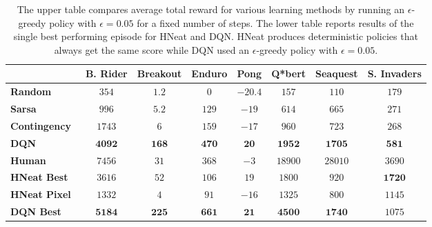 \documentclass{article} \usepackage{nips13submit_e,times}
\begin{document}
\begin{table}
\begin{center}
\begin{tabular}{ |l | c | c | c | c | c | c | c |}
	\hline
	& {\small \textbf{B. Rider}} & {\small \textbf{Breakout}} & {\small \textbf{Enduro}} & {\small \textbf{Pong}} & {\small \textbf{Q*bert}} & {\small \textbf{Seaquest}} & {\small \textbf{S. Invaders}}\\
	\hline
	{\small \textbf{Random}}                                    & $354$ & $1.2$ & $0$ & $-20.4$ & $157$ & $110$ & $179$ \\
	\hline
	{\small \textbf{Sarsa}~\cite{bellemare-ale}}                & $996$ & $5.2$ & $129$ & $-19$ & $614$ & $665$ & $271$ \\
	\hline
	{\small \textbf{Contingency}~\cite{bellemare-contingency} } & $1743$ & $6$ & $159$ & $-17$ & $960$ & $723$ & $268$ \\
	\hline
	{\small \textbf{DQN} }                                      & $\textbf{4092}$ & $\textbf{168}$ & $\textbf{470}$ & $\textbf{20}$ & $\textbf{1952}$ & $\textbf{1705}$ & $\textbf{581}$ \\
	\hline
	{\small \textbf{Human} }                                    & $7456$ & $31$ & $368$ & $-3$ & $18900$ & $28010$ & $3690$ \\
	\hline
	\hline
	{\small \textbf{HNeat Best} \cite{hausknecht-neuro}}        & $3616$ & $52$ & $106$ & $19$ & $1800$ & $920$ & $\textbf{1720}$ \\
	\hline
	{\small \textbf{HNeat Pixel} \cite{hausknecht-neuro}}       & $1332$ & $4$ & $91$ & $-16$ & $1325$ & $800$ & $1145$ \\
	\hline
	{\small \textbf{DQN Best}}                                  & $\textbf{5184}$ & $\textbf{225}$ & $\textbf{661}$ & $\textbf{21}$ & $\textbf{4500}$ & $\textbf{1740}$ & $1075$ \\
	\hline
\end{tabular}
\caption{\label{table-results} The upper table compares average total reward for various learning methods by running an $\epsilon$-greedy policy with $\epsilon=0.05$ for a fixed number of steps. The lower table reports results of the single best performing episode for HNeat and DQN.  HNeat produces deterministic policies that always get the same score while DQN used an $\epsilon$-greedy policy with $\epsilon=0.05$.}
\end{center}
\end{table}
\end{document}
